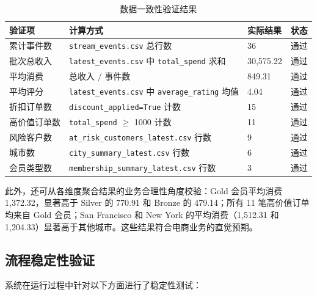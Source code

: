 \documentclass[12pt,hyperref,a4paper,UTF8]{ctexart}
\begin{document}
\begin{table}[H]
\centering
\caption{数据一致性验证结果}
\begin{tabular}{llll}
\toprule
验证项 & 计算方式 & 实际结果 & 状态 \\
\midrule
累计事件数 & \texttt{stream\_events.csv} 总行数 & 36 & 通过 \\
批次总收入 & \texttt{latest\_events.csv} 中 \texttt{total\_spend} 求和 & 30,575.22 & 通过 \\
平均消费 & 总收入 $/$ 事件数 & 849.31 & 通过 \\
平均评分 & \texttt{latest\_events.csv} 中 \texttt{average\_rating} 均值 & 4.04 & 通过 \\
折扣订单数 & \texttt{discount\_applied=True} 计数 & 15 & 通过 \\
高价值订单数 & \texttt{total\_spend} $\geq$ 1000 计数 & 11 & 通过 \\
风险客户数 & \texttt{at\_risk\_customers\_latest.csv} 行数 & 9 & 通过 \\
城市数 & \texttt{city\_summary\_latest.csv} 行数 & 6 & 通过 \\
会员类型数 & \texttt{membership\_summary\_latest.csv} 行数 & 3 & 通过 \\
\bottomrule
\end{tabular}
\end{table}

此外，还可从各维度聚合结果的业务合理性角度校验：Gold 会员平均消费 1,372.32，显著高于 Silver 的 770.91 和 Bronze 的 479.14；所有 11 笔高价值订单均来自 Gold 会员；San Francisco 和 New York 的平均消费（1,512.31 和 1,204.33）显著高于其他城市。这些结果符合电商业务的直觉预期。

\subsection{流程稳定性验证}

系统在运行过程中针对以下方面进行了稳定性测试：
\end{document}
